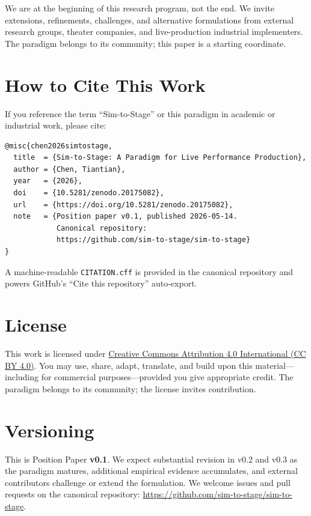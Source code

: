 \documentclass[11pt]{article}
\begin{document}
We are at the beginning of this research program, not the end.  We invite
extensions, refinements, challenges, and alternative formulations from
external research groups, theater companies, and live-production industrial
implementers.  The paradigm belongs to its community; this paper is a
starting coordinate.

\section*{How to Cite This Work}

If you reference the term ``Sim-to-Stage'' or this paradigm in academic
or industrial work, please cite:

\begin{verbatim}
@misc{chen2026simtostage,
  title  = {Sim-to-Stage: A Paradigm for Live Performance Production},
  author = {Chen, Tiantian},
  year   = {2026},
  doi    = {10.5281/zenodo.20175082},
  url    = {https://doi.org/10.5281/zenodo.20175082},
  note   = {Position paper v0.1, published 2026-05-14.
            Canonical repository:
            https://github.com/sim-to-stage/sim-to-stage}
}
\end{verbatim}

A machine-readable \texttt{CITATION.cff} is provided in the canonical
repository and powers GitHub's ``Cite this repository'' auto-export.

\section*{License}

This work is licensed under
\href{https://creativecommons.org/licenses/by/4.0/}{Creative Commons
Attribution 4.0 International (CC BY 4.0)}.  You may use, share, adapt,
translate, and build upon this material---including for commercial
purposes---provided you give appropriate credit.  The paradigm belongs to
its community; the license invites contribution.

\section*{Versioning}

This is Position Paper \textbf{v0.1}.  We expect substantial revision in
v0.2 and v0.3 as the paradigm matures, additional empirical evidence
accumulates, and external contributors challenge or extend the formulation.
We welcome issues and pull requests on the canonical repository:
\url{https://github.com/sim-to-stage/sim-to-stage}.
\end{document}
